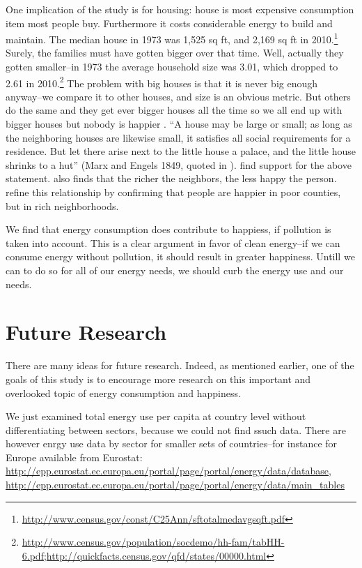 \documentclass[10pt, letterpaper]{article}
\begin{document}
\begin{spacing}{1.4}
One implication of the study is for housing: house is most expensive consumption
item most people buy. Furthermore it costs considerable energy to build and
maintain. The median house in 1973 was 1,525 sq ft, and 2,169  sq ft in 2010.\footnote{\url{http://www.census.gov/const/C25Ann/sftotalmedavgsqft.pdf}}
Surely, the families must have gotten bigger over that time. Well,
actually they gotten smaller--in 1973 the average household size was
3.01, which dropped to 2.61 in
2010.\footnote{\url{http://www.census.gov/population/socdemo/hh-fam/tabHH-6.pdf};\url{http://quickfacts.census.gov/qfd/states/00000.html}}
The problem with big houses is that it is never big enough anyway--we
compare it to other houses, and size is an obvious metric. But others
do the same and they get ever bigger houses all the time so we all end
up with bigger houses but nobody is happier \citep{frank12}. ``A house may be large or small; as long as the neighboring houses are
likewise small, it satisfies all social requirements for a
residence. But let there arise next to the little house a palace, and
the little house shrinks to a hut'' (Marx and Engels 1849, quoted in
\citet{dittmann10}). \citet{dittmann10} find support for the above
statement. \citet{luttmer05} also finds that the richer the neighbors,
the less happy the person.
\citet{firebaugh09} refine this relationship by confirming that people
are happier in poor counties, but in  rich neighborhoods. 

We find that energy consumption does contribute to happiess, if pollution is
taken into account. This is a clear argument in favor of clean energy--if we can
consume energy without pollution, it should result in greater happiness. Untill
we can to do so for all of our energy needs, we should curb the energy use and
our needs.

\section{Future Research}

There are many ideas for future research. Indeed, as mentioned earlier, one of
the goals of this study is to encourage more research on this important and
overlooked topic of energy consumption and happiness.

We just examined total energy use per capita at country level without
differentiating between sectors, because we could not find ssuch data. There are
however enrgy use data by sector for smaller sets of countries--for instance for
Europe available from Eurostat: 
\url{http://epp.eurostat.ec.europa.eu/portal/page/portal/energy/data/database}, \url{http://epp.eurostat.ec.europa.eu/portal/page/portal/energy/data/main_tables} 


\end{spacing}
\end{document}
